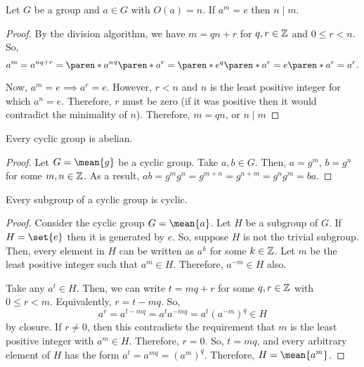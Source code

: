\documentclass[11pt]{penrose}
\newcommand{\cyclic}[1]{\mean{#1}}
\begin{document}
\begin{nthm}
    Let $G$ be a group and $a \in G$ with $O(a) = n$. If $a^m = e$ then $n \mid m$.
\end{nthm}
\begin{proof}
    By the division algorithm, we have $m = qn + r$ for $q, r \in \mathbb{Z}$ and $0 \leq r < n$. So,
    \begin{equation*}
        a^m = a^{nq + r} = \paren*{{a^n}^q} \paren*{a^r} = \paren*{e^q} \paren*{a^r} = e \paren*{a^r} = a^r.
    \end{equation*}

    Now, $a^m = e \implies a^r = e$. However, $r < n$ and $n$ is the least positive integer for which $a^n = e$. Therefore, $r$ must be zero (if it was positive then it would contradict the minimality of $n$). Therefore, $m = qn$, or $n \mid m$
\end{proof}

\begin{nthm}
    Every cyclic group is abelian.
\end{nthm}
\begin{proof}
    Let $G = \cyclic{g}$ be a cyclic group. Take $a, b \in G$. Then, $a = g^m$, $b = g^n$ for some $m, n \in \mathbb{Z}$. As a result, $ab = g^m g^n = g^{m+n} = g^{n+m} = g^n g^m = ba$.
\end{proof}

\begin{nthm}
    Every subgroup of a cyclic group is cyclic.
\end{nthm}
\begin{proof}
    Consider the cyclic group $G = \cyclic{a}$. Let $H$ be a subgroup of $G$. If $H = \set{e}$ then it is generated by $e$. So, suppose $H$ is not the trivial subgroup. Then, every element in $H$ can be written as $a^k$ for some $k \in \mathbb{Z}$. Let $m$ be the least positive integer such that $a^m \in H$. Therefore, $a^{-m} \in H$ also.

    Take any $a^t \in H$. Then, we can write $t = mq + r$ for some $q, r \in \mathbb{Z}$ with $0 \leq r < m$. Equivalently, $r = t - mq$. So,
    \begin{equation*}
        a^r = a^{t - mq} = a^{t} a^{-mq} = a^{t} (a^{-m})^{q} \in H
    \end{equation*}
    by closure. If $r \neq 0$, then this contradicts the requirement that $m$ is the least positive integer with $a^m \in H$. Therefore, $r = 0$. So, $t = mq$, and every arbitrary element of $H$ has the form $a^t = a^{mq} = (a^{m})^{q}$. Therefore, $H = \cyclic{a^m}$.
\end{proof}
\end{document}
